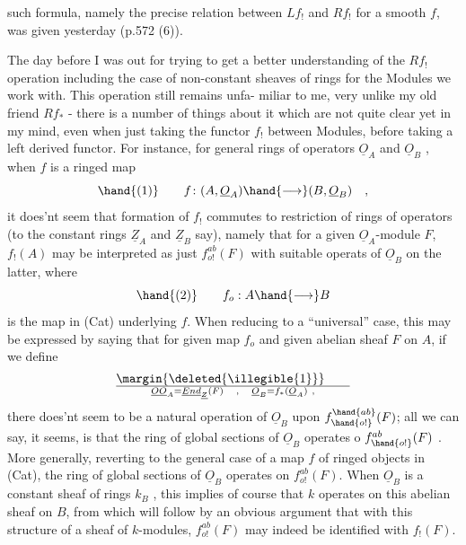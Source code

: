 
such formula, namely the precise relation between $Lf_!$ and $Rf_!$ for
a smooth $f$, was given yesterday  (p.572 (6)).

The day before\hand{,} I was out for trying to get a better understanding
of the $Rf_!$ operation\deleted{\unsure{,}} \hand{(}including the case of non-constant sheaves of
rings for the Modules we work with\hand{)}. This operation still remains unfa-%
miliar to me, very unlike my old friend $Rf_*$ - there is a number of
things about it which are not quite clear  yet in my mind,
even when just taking the functor $f_!$ between Modules, before taking a
left derived functor. For instance, for general rings of operators
$\underline{O}_A$ and $\underline{O}_B$ , when $f$ is a ringed map
\[ \hand{(1)} \qquad f\colon (A,\underline{O}_A)\hand{\longrightarrow} (B,\underline{O}_B) \quad , \]
it does'nt seem that formation of $f_!$ commutes to restriction of
rings of operators (to the constant rings $\underline{Z}_A$ and $\underline{Z}_B$ say), namely that
for a given $\underline{O}_A$-module $F$, $f_!(A)$ may be interpreted as just $f^{ab}_{o!}(F)$ with
suitable operats of $\underline{O}_B$ on the latter, where
\[ \hand{(2)} \qquad f_o : A\hand{\longrightarrow} B \]
is the map in (Cat) underlying $f$. When reducing to a  ``universal'' case,
this may be expressed by saying that for given map $f_o$ and given abelian
sheaf $F$ on $A$, if we define
\[ \margin{\deleted{\illegible{1}}} \qquad \over{\underline{O}}{\underline{O}}_A= \underline{End}_{\underline{Z}}(F) \quad , \quad \underline{O}_B = f_*(\underline{O}_A) \ , \]
there does'nt seem to be a natural operation of $\underline{O}_B$ upon $f^{\hand{ab}}_{\hand{o!}}(F)$; all we
can say, it seems, is that the ring of global sections of $\underline{O}_B$ operates
o $f^{ab}_{\hand{o!}}(F)$ . More generally, reverting to the general case of a map $f$
of ringed objects in (Cat), the ring of global sections of $\underline{O}_B$ operates
on $f^{ab}_{o!}(F)$. When $\underline{O}_B$ is a constant sheaf of rings $k_B$ , this implies
of course that $k$ operates on this abelian sheaf on $B$, from which will
follow by an obvious argument that with this structure of a sheaf of
$k$-modules, $f^{ab}_{o!}(F)$ may indeed be identified with $f_!(F)$.

